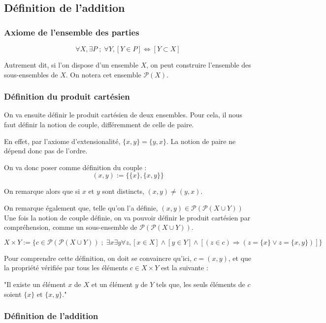 \documentclass{article}
\begin{document}
\subsection{Définition de l'addition}
\subsubsection{Axiome de l'ensemble des parties}
$$\boxed{\forall X, \exists P \; ; \; \forall Y, [Y \in P] \Leftrightarrow [Y \subset X]}$$

Autrement dit, si l'on dispose d'un ensemble $X$, on peut construire l'ensemble des sous-ensembles de $X$. On notera cet ensemble $\mathcal{P}(X)$.


\subsubsection{Définition du produit cartésien}

On va ensuite définir le produit cartésien de deux ensembles. Pour cela, il nous faut définir la notion de couple, différemment de celle de paire.

En effet, par l'axiome d'extensionalité, $\{x,y\} = \{y,x\}$. La notion de paire ne dépend donc pas de l'ordre.

On va donc poser comme définition du couple :
$$(x,y) := \{\{x\},\{x,y\}\}$$

On remarque alors que si $x$ et $y$ sont distincts, $(x,y) \ne (y,x)$.

On remarque également que, telle qu'on l'a définie, $(x,y) \in \mathcal{P}(\mathcal{P}(X \cup Y))$
\\

Une fois la notion de couple définie, on va pouvoir définir le produit cartésien par compréhension, comme un sous-ensemble de $\mathcal{P}(\mathcal{P}(X \cup Y))$.

$$\boxed{X \times Y := \{ c \in \mathcal{P}(\mathcal{P}(X \cup Y)) \; ; \; \exists x \exists y \forall z, [x \in X] \wedge [y \in Y] \wedge [(z \in c) \Rightarrow (z = \{x\} \lor z = \{x,y\})]\}}$$

Pour comprendre cette définition, on doit se convaincre qu'ici, $c = (x,
y)$, et que la propriété vérifiée par tous les éléments $c \in X \times Y$ est la suivante :

"Il existe un élément $x$ de $X$ et un élément $y$ de $Y$ tels que, les seuls éléments de $c$ soient $\{x\}$ et $\{x,y\}$."

\subsubsection{Définition de l'addition}
\end{document}
